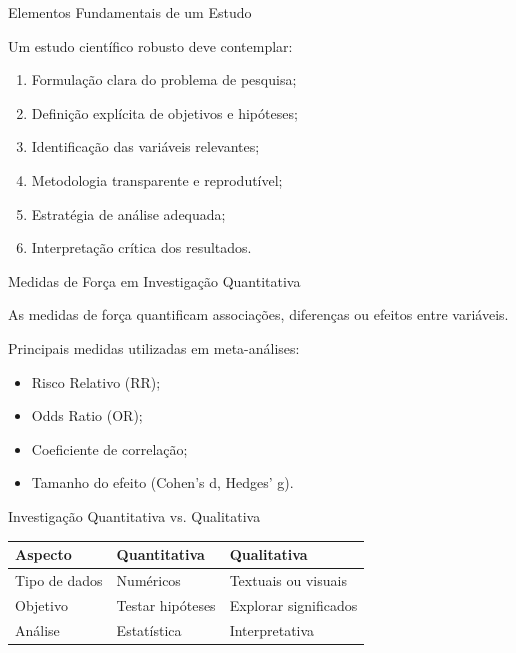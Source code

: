 \documentclass[aspectratio=169]{beamer}
\begin{document}
\begin{frame}{Elementos Fundamentais de um Estudo}

Um estudo científico robusto deve contemplar:

\begin{enumerate}
    \item Formulação clara do problema de pesquisa;
    \item Definição explícita de objetivos e hipóteses;
    \item Identificação das variáveis relevantes;
    \item Metodologia transparente e reprodutível;
    \item Estratégia de análise adequada;
    \item Interpretação crítica dos resultados.
\end{enumerate}

\end{frame}

\begin{frame}{Medidas de Força em Investigação Quantitativa}

As medidas de força quantificam associações, diferenças ou efeitos entre variáveis.

\vspace{0.3cm}

Principais medidas utilizadas em meta-análises:

\begin{itemize}
    \item Risco Relativo (RR);
    \item Odds Ratio (OR);
    \item Coeficiente de correlação;
    \item Tamanho do efeito (Cohen’s d, Hedges’ g).
\end{itemize}

\end{frame}

\begin{frame}{Investigação Quantitativa vs. Qualitativa}

\begin{table}
\centering
\begin{tabular}{p{4cm} p{4cm} p{4cm}}
\toprule
\textbf{Aspecto} & \textbf{Quantitativa} & \textbf{Qualitativa} \\
\midrule
Tipo de dados & Numéricos & Textuais ou visuais \\
Objetivo & Testar hipóteses & Explorar significados \\
Análise & Estatística & Interpretativa \\
\bottomrule
\end{tabular}
\end{table}

\end{frame}
\end{document}
